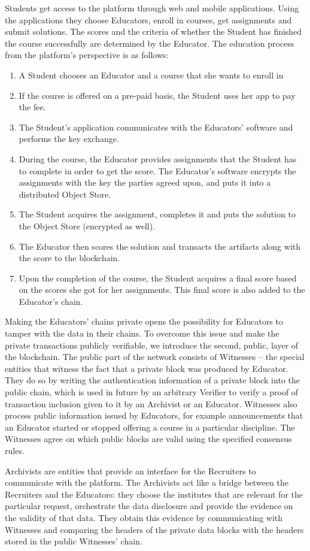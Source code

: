 Students get access to the platform through web and mobile applications. Using the applications they choose Educators, enroll in courses, get assignments and submit solutions. The scores and the criteria of whether the Student has finished the course successfully are determined by the Educator. The education process from the platform’s perspective is as follows:
\begin{enumerate}
\item A Student chooses an Educator and a course that she wants to enroll in
\item If the course is offered on a pre-paid basis, the Student uses her app to pay the fee.
\item The Student’s application communicates with the Educators’ software and performs the key exchange.
\item During the course, the Educator provides assignments that the Student has to complete in order to get the score. The Educator’s software encrypts the assignments with the key the parties agreed upon, and puts it into a distributed Object Store.
\item The Student acquires the assignment, completes it and puts the solution to the Object Store (encrypted as well).
\item The Educator then scores the solution and transacts the artifacts along with the score to the blockchain.
\item Upon the completion of the course, the Student acquires a final score based on the scores she got for her assignments. This final score is also added to the Educator’s chain.
\end{enumerate}

Making the Educators' chains private opens the possibility for Educators to tamper with the data in their chains. To overcome this issue and make the private transactions publicly verifiable, we introduce the second, public, layer of the blockchain. The public part of the network consists
of Witnesses – the special entities that witness the fact that a private block was produced by Educator.
They do so by writing the authentication information of a private block into the public chain, which is used in future by an arbitrary Verifier to verify a proof of transaction inclusion given to it by an Archivist or an Educator. Witnesses also process public information issued by Educators, for example announcements that an Educator started or stopped offering a course in a particular discipline. The Witnesses agree on which public blocks are valid using the specified consensus rules.

Archivists are entities that provide an interface for the Recruiters to communicate with the platform. The Archivists act like a bridge between the Recruiters and the Educators: they choose the institutes that are relevant for the particular request, orchestrate the data disclosure and provide the evidence on the validity of that data. They obtain this evidence by communicating with Witnesses and comparing the headers of the private data blocks with the headers stored in the public Witnesses' chain.
